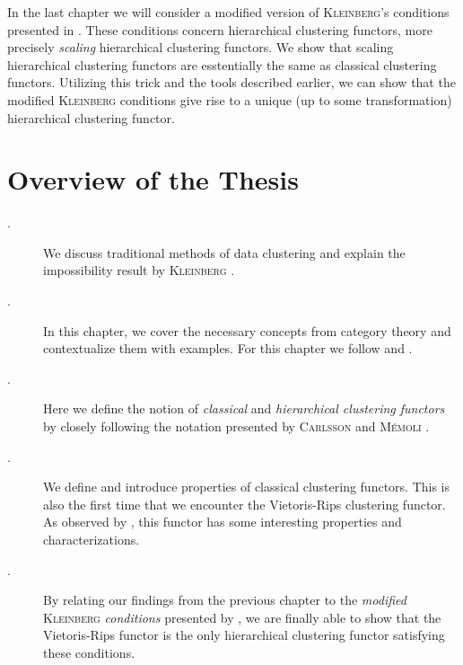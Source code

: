 In the last chapter we will consider a modified version of \textsc{Kleinberg}'s conditions presented in \cite[Sec.~7.3.1]{Carlsson2010}. These conditions concern hierarchical clustering functors, more precisely \emph{scaling} hierarchical clustering functors. We show that scaling hierarchical clustering functors are esstentially the same as classical clustering functors. Utilizing this trick and the tools described earlier, we can show that the modified \textsc{Kleinberg} conditions give rise to a unique (up to some transformation) hierarchical clustering functor.

\section*{Overview of the Thesis}
\begin{description}

    \item[.] We discuss traditional methods of data clustering and explain the impossibility result by \textsc{Kleinberg} \cite{Kleinberg2002}.

    \item[.] In this chapter, we cover the necessary concepts from category theory and contextualize them with examples. For this chapter we follow \cite{Roman2017} and \cite{Leinster2014-dc}.

    \item[.] Here we define the notion of \emph{classical} and \emph{hierarchical clustering functors} by closely following the notation presented by \textsc{Carlsson} and \textsc{M\'emoli} \cite{Carlsson2010}.

    \item[.] We define and introduce properties of classical clustering functors. This is also the first time that we encounter the Vietoris-Rips clustering functor. As observed by \cite{JMLR:v11:carlsson10a}, \cite{Carlsson2010} this functor has some interesting properties and characterizations.

    \item[.] By relating our findings from the previous chapter to the \emph{modified} \textsc{Kleinberg} \emph{conditions} presented by \cite[Sec.~7.3.1]{Carlsson2010}, we are finally able to show that the Vietoris-Rips functor is the only hierarchical clustering functor satisfying these conditions.
\end{description}

